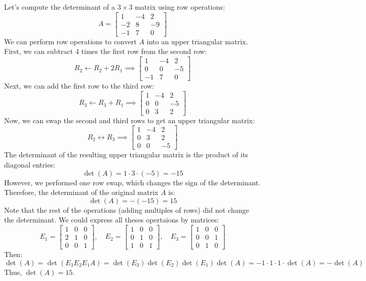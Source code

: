 \begin{eg}
    Let's compute the determinant of a \(3 \times 3\) matrix using row operations:
    \[
        A = \begin{bmatrix}
            1 & -4 & 2 \\
            -2 & 8 & -9 \\
            -1 & 7 & 0
        \end{bmatrix}
    \]
    We can perform row operations to convert \(A\) into an upper triangular matrix. First, we can subtract \(4\) times the first row from the second row:
    \[
        R_2 \leftarrow R_2 + 2R_1 \implies \begin{bmatrix}
            1 & -4 & 2 \\
            0 & 0 & -5 \\
            -1 & 7 & 0
        \end{bmatrix}
    \]
    Next, we can add the first row to the third row:
    \[
        R_3 \leftarrow R_3 + R_1 \implies \begin{bmatrix}
            1 & -4 & 2 \\
            0 & 0 & -5 \\
            0 & 3 & 2
        \end{bmatrix}
    \]
    Now, we can swap the second and third rows to get an upper triangular matrix:
    \[
        R_2 \leftrightarrow R_3 \implies \begin{bmatrix}
            1 & -4 & 2 \\
            0 & 3 & 2 \\
            0 & 0 & -5
        \end{bmatrix}
    \]
    The determinant of the resulting upper triangular matrix is the product of its diagonal entries:
    \[
        \det(A) = 1 \cdot 3 \cdot (-5) = -15
    \]
    However, we performed one row swap, which changes the sign of the determinant. Therefore, the determinant of the original matrix \(A\) is:
    \[
        \det(A) = -(-15) = 15
    \]
    Note that the rest of the operations (adding multiples of rows) did not change the determinant. We could express all theses opertaions by matrices:
    \[
        E_1 = \begin{bmatrix}
            1 & 0 & 0 \\
            2 & 1 & 0 \\
            0 & 0 & 1
        \end{bmatrix}, \quad
        E_2 = \begin{bmatrix}
            1 & 0 & 0 \\
            0 & 1 & 0 \\
            1 & 0 & 1
        \end{bmatrix}, \quad
        E_3 = \begin{bmatrix}
            1 & 0 & 0 \\
            0 & 0 & 1 \\
            0 & 1 & 0
        \end{bmatrix}
    \]
    Then:
    \[
        \det(A) = \det(E_3 E_2 E_1 A) = \det(E_3) \det(E_2) \det(E_1) \det(A) = -1 \cdot 1 \cdot 1 \cdot \det(A) = -\det(A)
    \]
    Thus, \(\det(A) = 15\).
\end{eg}

